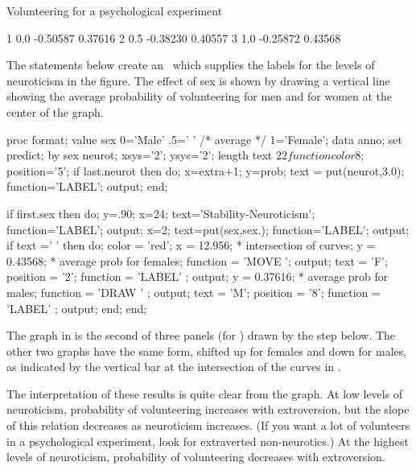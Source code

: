 \begin{Example}[davis]{Volunteering for a psychological experiment}
\begin{output}
                      1     0.0    -0.50587    0.37616
                      2     0.5    -0.38230    0.40557
                      3     1.0    -0.25872    0.43568
\end{output}
The statements below create an \ADS\ which supplies the labels
for the levels of neuroticism in the figure.
The effect of sex is shown by drawing a vertical line
showing the average probability of volunteering for men and for women
at the center of the graph.
\begin{listing}
proc format;
   value sex 0='Male'
            .5=' '           /* average */
             1='Female';
data anno;
   set predict;
   by sex neurot;
   xsys='2'; ysys='2';
   length text $22 function color $8;
   position='5';
   if last.neurot then do;
      x=extra+1;
      y=prob;
      text = put(neurot,3.0); function='LABEL'; output;
      end;

   if first.sex then do;
      y=.90;
      x=24; text='Stability-Neuroticism';
      function='LABEL'; output;
      x=2; text=put(sex,sex.);
      function='LABEL'; output;
      if text =' ' then do;
         color = 'red';
         x = 12.956;                * intersection of curves;
         y = 0.43568;               * average prob for females;
         function = 'MOVE '; output;
         text = 'F'; position = '2';
         function = 'LABEL' ; output;
         y = 0.37616;               * average prob for males;
         function = 'DRAW ' ; output;
         text = 'M'; position = '8';
         function = 'LABEL' ; output;
         end;
      end;
\end{listing}
The graph in  is the second of three panels 
(for ) drawn by the
 step below.
The other two graphs have the same form, shifted up for females
and down for males, as indicated by the vertical bar at the
intersection of the curves in .
The interpretation of these results is quite clear from the graph.
At low levels of neuroticism, probability of volunteering increases
with extroversion, but the slope of this relation decreases
as neuroticism increases.
(If you want a lot of volunteers in a psychological experiment,
look for extraverted non-neurotics.)
At the highest levels of neuroticism,
probability of volunteering decreases with extroversion.


\end{Example}
